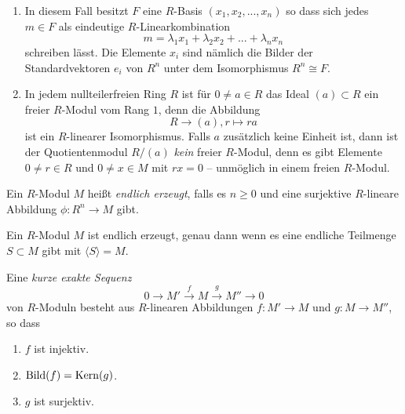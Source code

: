 \documentclass{book}
\begin{document}
\begin{exas}
    \label{exas:fg} 
    \begin{enumerate}
        \item In diesem Fall besitzt $F$ eine $R$-Basis $(x_1,
            x_2, ..., x_n)$ so dass sich jedes $m \in F$ als eindeutige
            $R$-Linearkombination
            \[
                m = \lambda_1 x_1 + \lambda_2 x_2 + ... + \lambda_n x_n
            \]
            schreiben lässt. Die Elemente $x_i$ sind nämlich die Bilder der
            Standardvektoren $e_i$ von $R^n$ unter dem Isomorphismus $R^n \cong
            F$.
        \item In jedem nullteilerfreien Ring $R$ ist für $0 \ne a \in R$ 
            das Ideal $(a) \subset R$ ein freier $R$-Modul vom Rang $1$,
            denn die Abbildung
            \[
                R \to (a), r \mapsto ra
            \]
            ist ein $R$-linearer Isomorphismus. Falls $a$ zusätzlich keine
            Einheit ist, dann ist der Quotientenmodul $R/(a)$ \emph{kein}
            freier $R$-Modul, denn es gibt Elemente $0 \ne r \in R$ und $0 \ne x \in M$ 
            mit $rx = 0$ -- unmöglich in einem freien $R$-Modul.
    \end{enumerate} 
\end{exas}

\begin{defi}
    \label{defi:label}
    Ein $R$-Modul $M$ heißt \emph{endlich erzeugt}, falls es $n \ge 0$ und eine
    surjektive $R$-lineare Abbildung $\phi: R^n \to M$ gibt. 
\end{defi}

\begin{rem}
    \label{rem:label}
    Ein $R$-Modul $M$ ist endlich erzeugt, genau dann wenn es eine endliche
    Teilmenge $S \subset M$ gibt mit $\langle S \rangle = M$. 
\end{rem}

\begin{defi}
    \label{defi:ses}
    Eine \emph{kurze exakte Sequenz}
    \[
        0 \to M' \overset{f}{\to} M \overset{g}{\to} M'' \to 0
    \]
    von $R$-Moduln besteht aus $R$-linearen Abbildungen $f: M' \to M$ und $g: M \to M''$, so dass
    \begin{enumerate}
        \item $f$ ist injektiv.
        \item $\operatorname{Bild}(f) = \operatorname{Kern}(g)$. 
        \item $g$ ist surjektiv. 
    \end{enumerate}
\end{defi}
\end{document}

